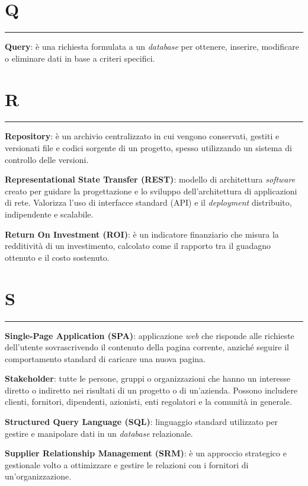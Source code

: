 \section*{Q}
{\color{lightgray}\rule{\textwidth}{0.4pt}} %
\begin{glossaryitemize}
    \item \textbf{Query}: è una richiesta formulata a un \textit{database} per ottenere, inserire, modificare o eliminare dati in base a criteri specifici.
\end{glossaryitemize}

\section*{R}
{\color{lightgray}\rule{\textwidth}{0.4pt}} %
\begin{glossaryitemize}
    \item \textbf{Repository}: è un archivio centralizzato in cui vengono conservati, gestiti e versionati file e codici sorgente di un progetto, spesso utilizzando un sistema di controllo delle versioni.
    \item \textbf{Representational State Transfer (REST)}: modello di architettura \textit{software} creato per guidare la progettazione e lo sviluppo dell'architettura di applicazioni di rete. Valorizza l'uso di interfacce standard (API) e il \textit{deployment} distribuito, indipendente e scalabile.
    \item \textbf{Return On Investment (ROI)}: è un indicatore finanziario che misura la redditività di un investimento, calcolato come il rapporto tra il guadagno ottenuto e il costo sostenuto.
\end{glossaryitemize}

\section*{S}
{\color{lightgray}\rule{\textwidth}{0.4pt}} %
\begin{glossaryitemize}
    \item \textbf{Single-Page Application (SPA)}: applicazione \textit{web} che risponde alle richieste dell'utente sovrascrivendo il contenuto della pagina corrente, anziché seguire il comportamento standard di caricare una nuova pagina.
    \item \textbf{Stakeholder}: tutte le persone, gruppi o organizzazioni che hanno un interesse diretto o indiretto nei risultati di un progetto o di un'azienda. Possono includere clienti, fornitori, dipendenti, azionisti, enti regolatori e la comunità in generale.
    \item \textbf{Structured Query Language (SQL)}: linguaggio standard utilizzato per gestire e manipolare dati in un \textit{database} relazionale.
    \item \textbf{Supplier Relationship Management (SRM)}: è un approccio strategico e gestionale volto a ottimizzare e gestire le relazioni con i fornitori di un'organizzazione.
\end{glossaryitemize}

